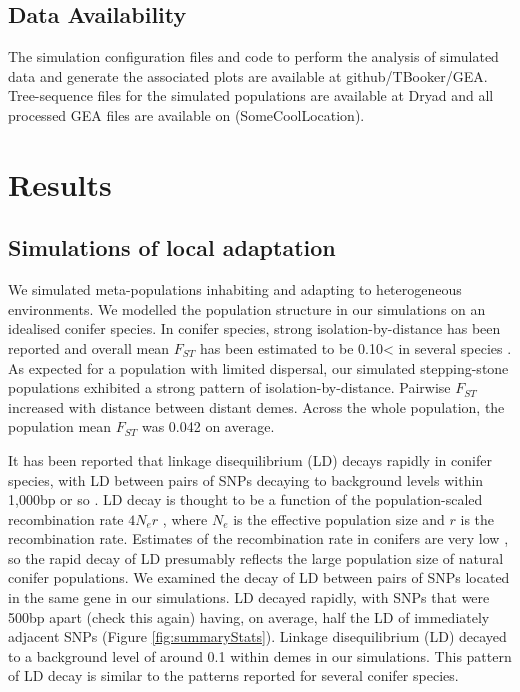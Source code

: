 \documentclass[10pt,twoside,lineno, twocolumn]{GSA_format}
\begin{document}
\subsection{Data Availability}

The simulation configuration files and code to perform the analysis of simulated data and generate the associated plots are available at github/TBooker/GEA. Tree-sequence files for the simulated populations are available at Dryad and all processed GEA files are available on (SomeCoolLocation). 

\section{Results}

\subsection{Simulations of local adaptation}

We simulated meta-populations inhabiting and adapting to heterogeneous environments. We modelled the population structure in our simulations on an idealised conifer species. In conifer species, strong isolation-by-distance has been reported and overall mean $F_{ST}$ has been estimated to be 0.10< in several species \citep{Mimura2007,Mosca2014}. As expected for a population with limited dispersal, our simulated stepping-stone populations exhibited a strong pattern of isolation-by-distance. Pairwise $F_{ST}$ increased with distance between distant demes. Across the whole population, the population mean $F_{ST}$ was 0.042 on average.

It has been reported that linkage disequilibrium (LD) decays rapidly in conifer species, with LD between pairs of SNPs decaying to background levels within 1,000bp or so \citep{Pavy2012}. LD decay is thought to be a function of the population-scaled recombination rate $4N_er$ \citep{Wakeley2003}, where $N_e$ is the effective population size and $r$ is the recombination rate. Estimates of the recombination rate in conifers are very low \citep{Stapley2017}, so the rapid decay of LD presumably reflects the large population size of natural conifer populations. We examined the decay of LD between pairs of SNPs located in the same gene in our simulations. LD decayed rapidly, with SNPs that were 500bp apart (check this again) having, on average, half the LD of immediately adjacent SNPs (Figure \ref{fig:summaryStats}). Linkage disequilibrium (LD) decayed to a background level of around 0.1  within demes in our simulations. This pattern of LD decay is similar to the patterns reported for several conifer species.
\end{document}
